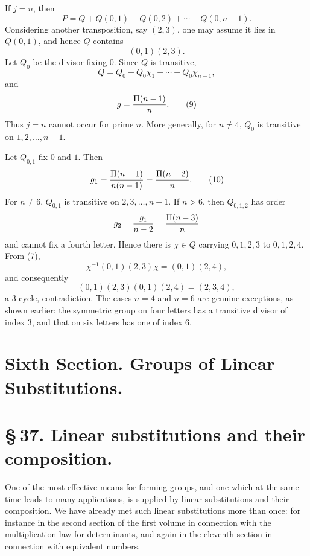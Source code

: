 \documentclass[11pt]{article}
\begin{document}
If $j=n$, then
\begin{equation}
P=Q+Q(0,1)+Q(0,2)+\cdots+Q(0,n-1).
\tag{6}
\end{equation}
Considering another transposition, say $(2,3)$, one may assume it lies in $Q(0,1)$, and hence $Q$ contains
\begin{equation}
(0,1)(2,3).
\tag{7}
\end{equation}
Let $Q_0$ be the divisor fixing $0$. Since $Q$ is transitive,
\begin{equation}
Q=Q_0+Q_0\chi_1+\cdots+Q_0\chi_{n-1},
\tag{8}
\end{equation}
and
\begin{equation}
g={\Pi(n-1)\over n}.
\tag{9}
\end{equation}
Thus $j=n$ cannot occur for prime $n$. More generally, for $n\ne4$, $Q_0$ is transitive on $1,2,\ldots,n-1$.

Let $Q_{0,1}$ fix $0$ and $1$. Then
\begin{equation}
g_1={\Pi(n-1)\over n(n-1)}={\Pi(n-2)\over n}.
\tag{10}
\end{equation}
For $n\ne6$, $Q_{0,1}$ is transitive on $2,3,
\ldots,n-1$. If $n>6$, then $Q_{0,1,2}$ has order
\[
g_2={g_1\over n-2}={\Pi(n-3)\over n}
\]
and cannot fix a fourth letter. Hence there is $\chi\in Q$ carrying $0,1,2,3$ to $0,1,2,4$. From (7),
\[
\chi^{-1}(0,1)(2,3)\chi=(0,1)(2,4),
\]
and consequently
\[
(0,1)(2,3)(0,1)(2,4)=(2,3,4),
\]
a 3-cycle, contradiction. The cases $n=4$ and $n=6$ are genuine exceptions, as shown earlier: the symmetric group on four letters has a transitive divisor of index $3$, and that on six letters has one of index $6$.

\clearpage
\section*{Sixth Section. Groups of Linear Substitutions.}

\section*{\S\,37. Linear substitutions and their composition.}

One of the most effective means for forming groups, and one which at the same time leads to many applications, is supplied by linear substitutions and their composition. We have already met such linear substitutions more than once: for instance in the second section of the first volume in connection with the multiplication law for determinants, and again in the eleventh section in connection with equivalent numbers.
\end{document}
